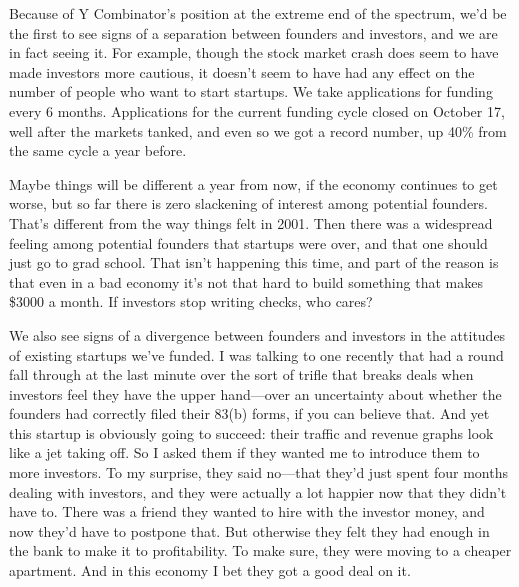 Because of
                  Y Combinator's position at the extreme end of the spectrum,
                  we'd be the first to see signs of a separation between
                  founders and investors, and we are in fact seeing it. For
                  example, though the stock market crash does seem to have made
                  investors more cautious, it doesn't seem to have had any
                  effect on the number of people who want to start startups. We
                  take applications for funding every 6 months. Applications for
                  the current funding cycle closed on October 17, well after the
                  markets tanked, and even so we got a record number, up 40\%
                  from the same cycle a year before.

Maybe things
                  will be different a year from now, if the economy continues to
                  get worse, but so far there is zero slackening of interest
                  among potential founders. That's different from the way things
                  felt in 2001. Then there was a widespread feeling among
                  potential founders that startups were over, and that one
                  should just go to grad school. That isn't happening this time,
                  and part of the reason is that even in a bad economy it's not
                  that hard to build something that makes \$3000 a month. If
                  investors stop writing checks, who cares?

We also
                  see signs of a divergence between founders and investors in
                  the attitudes of existing startups we've funded. I was talking
                  to one recently that had a round fall through at the last
                  minute over the sort of trifle that breaks deals when
                  investors feel they have the upper hand---over an
                  uncertainty about whether the founders had correctly filed
                  their 83(b) forms, if you can believe that. And yet this
                  startup is obviously going to succeed: their traffic and
                  revenue graphs look like a jet taking off. So I asked them if
                  they wanted me to introduce them to more investors. To my
                  surprise, they said no---that they'd just spent four
                  months dealing with investors, and they were actually a lot
                  happier now that they didn't have to. There was a friend they
                  wanted to hire with the investor money, and now they'd have to
                  postpone that. But otherwise they felt they had enough in the
                  bank to make it to profitability. To make sure, they were
                  moving to a cheaper apartment. And in this economy I bet they
                  got a good deal on it.

